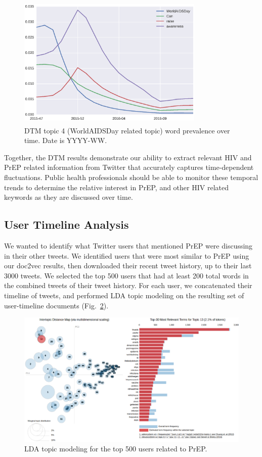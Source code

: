 \documentclass[conference]{IEEEtran}
\begin{document}
\begin{figure}
\centering
\includegraphics[height=2.5in, width=3.5in]{figs/Fig4}
\caption{DTM topic 4 (WorldAIDSDay related topic) word prevalence over time. Date is YYYY-WW.}
\label{fig:aids}
\end{figure}

Together, the DTM results demonstrate our ability to extract relevant HIV and PrEP related information from Twitter that accurately captures time-dependent fluctuations. Public health professionals should be able to monitor these temporal trends to determine the relative interest in PrEP, and other HIV related keywords as they are discussed over time.

\subsection{User Timeline Analysis}

We wanted to identify what Twitter users that mentioned PrEP were discussing in their other tweets. We identified users that were most similar to PrEP using our doc2vec results, then downloaded their recent tweet history, up to their last 3000 tweets. We selected the top 500 users that had at least 200 total words in the combined tweets of their tweet history. For each user, we concatenated their timeline of tweets, and performed LDA topic modeling on the resulting set of user-timeline documents (Fig.~\ref{fig:lda}).

\begin{figure}
\centering
\includegraphics[scale=0.5]{figs/Fig5}
\caption{LDA topic modeling for the top 500 users related to PrEP.}
\label{fig:lda}
\end{figure}
\end{document}
